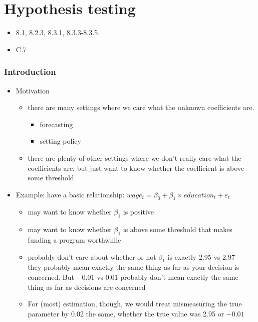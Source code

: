 
\part*{Hypothesis testing}%

\begin{itemize}
\item \citet{CaB_2001} 8.1, 8.2.3, 8.3.1, 8.3.3-8.3.5.
\item \citet{Gre_2011} C.7
\end{itemize}

\section{Introduction}

\begin{itemize}
\item Motivation
\begin{itemize}
\item there are many settings where we care what the unknown
       coefficients are.
\begin{itemize}
\item forecasting
\item setting policy
\end{itemize}
\item there are plenty of other settings where we don't really care what
       the coefficients are, but just want to know whether the
       coefficient is above some threshold
\end{itemize}
\item Example: have a basic relationship: $wage_t = \beta_0 + \beta_1
     \times education_t + \varepsilon_t$
\begin{itemize}
\item may want to know whether $\beta_1$ is positive
\item may want to know whether $\beta_1$ is above some threshold that
       makes funding a program worthwhile
\item probably don't care about whether or not $\beta_1$ is exactly
       2.95 vs 2.97 -- they probably mean exactly the same thing as far
       as your decision is concerned.  But $-0.01$ vs 0.01 probably don't
       mean exactly the same thing as far as decisions are concerned
\item For (most) estimation, though, we would treat mismeasuring the
       true parameter by 0.02 the same, whether the true value was 2.95
       or $-0.01$
\end{itemize}
\end{itemize}

